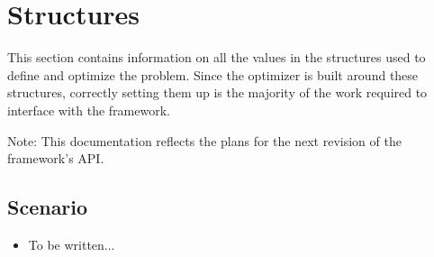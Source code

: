 \documentclass{article} %
\begin{document}
	\section{Structures}
		This section contains information on all the values in the structures used to define and optimize the problem.
		Since the optimizer is built around these structures, correctly setting them up is the majority of the work required to
		interface with the framework.

		Note: This documentation reflects the plans for the next revision of the framework's API.

		\subsection{Scenario}
			\begin{itemize}
				\item To be written... %
			\end{itemize}
\end{document}
